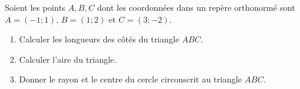 
\begin{exercice}\label{exoSeconde-0020}

    Soient%
    les points \( A,B,C\) dont les coordonnées dans un repère orthonormé sont \( A=(-1;1)\), \( B=(1;2)\) et \( C=(3;-2)\).
    \begin{enumerate}
        \item
            Calculer les longueurs des côtés du triangle \( ABC\).
        \item
            Calculer l'aire du triangle.
        \item
            Donner le rayon et le centre du cercle circonscrit au triangle \( ABC\).
    \end{enumerate}

\end{exercice}
